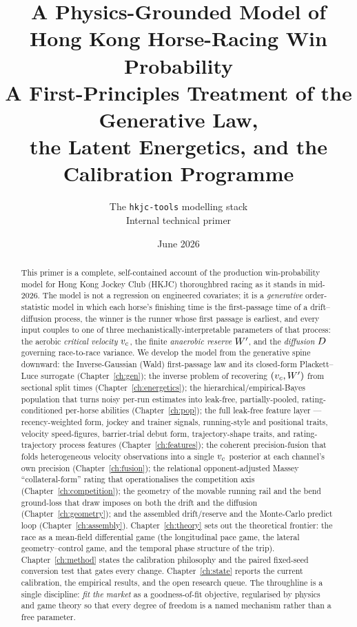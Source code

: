 \documentclass[11pt,oneside]{report}
\title{\Huge\bfseries A Physics-Grounded Model of\\[2mm] Hong Kong Horse-Racing Win Probability\\[6mm]
  \Large A First-Principles Treatment of the Generative Law,\\ the Latent Energetics, and the Calibration Programme}
\author{The \texttt{hkjc-tools} modelling stack\\[2mm]\normalsize Internal technical primer}
\date{June 2026}
\begin{document}
\maketitle

\begin{abstract}
\noindent This primer is a complete, self-contained account of the production win-probability
model for Hong Kong Jockey Club (HKJC) thoroughbred racing as it stands in mid-2026. The model
is not a regression on engineered covariates; it is a \emph{generative} order-statistic model in
which each horse's finishing time is the first-passage time of a drift--diffusion process, the
winner is the runner whose first passage is earliest, and every input couples to one of three
mechanistically-interpretable parameters of that process: the aerobic \emph{critical velocity}
${v_{c}}$, the finite \emph{anaerobic reserve} ${W^{\prime}}$, and the \emph{diffusion} $D$ governing
race-to-race variance. We develop the model from the generative spine downward: the
Inverse-Gaussian (Wald) first-passage law and its closed-form Plackett--Luce surrogate
(Chapter~\ref{ch:gen}); the inverse problem of recovering $({v_{c}},{W^{\prime}})$ from sectional split times
(Chapter~\ref{ch:energetics}); the hierarchical/empirical-Bayes population that turns noisy
per-run estimates into leak-free, partially-pooled, rating-conditioned per-horse abilities
(Chapter~\ref{ch:pop}); the full leak-free feature layer --- recency-weighted form, jockey and
trainer signals, running-style and positional traits, velocity speed-figures, barrier-trial
debut form, trajectory-shape traits, and rating-trajectory process features
(Chapter~\ref{ch:features}); the coherent precision-fusion that folds heterogeneous velocity
observations into a single ${v_{c}}$ posterior at each channel's own precision
(Chapter~\ref{ch:fusion}); the relational opponent-adjusted Massey ``collateral-form'' rating
that operationalises the competition axis (Chapter~\ref{ch:competition}); the geometry of the
movable running rail and the bend ground-loss that draw imposes on both the drift and the
diffusion (Chapter~\ref{ch:geometry}); and the assembled drift/reserve and the Monte-Carlo
predict loop (Chapter~\ref{ch:assembly}). Chapter~\ref{ch:theory} sets out the theoretical
frontier: the race as a mean-field differential game (the longitudinal pace game, the lateral
geometry--control game, and the temporal phase structure of the trip). Chapter~\ref{ch:method}
states the calibration philosophy and the paired fixed-seed conversion test that gates every
change. Chapter~\ref{ch:state} reports the current calibration, the empirical results, and the
open research queue. The throughline is a single discipline: \emph{fit the market} as a
goodness-of-fit objective, regularised by physics and game theory so that every degree of
freedom is a named mechanism rather than a free parameter.
\end{abstract}
\end{document}
